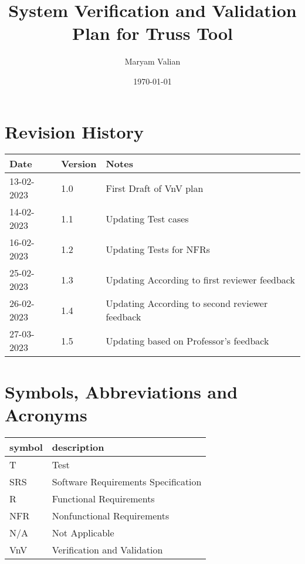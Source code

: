 \documentclass[12pt, titlepage]{article}
\begin{document}
\title{ System Verification and Validation Plan for Truss Tool} 
\author{Maryam Valian}
\date{\today}
	
\maketitle


\section{Revision History}

\begin{tabularx}{\textwidth}{p{3cm}p{2cm}X}
\toprule {\bf Date} & {\bf Version} & {\bf Notes}\\
\midrule
13-02-2023 & 1.0 & First Draft of VnV plan\\
14-02-2023 & 1.1& Updating Test cases   \\
16-02-2023 & 1.2& Updating Tests for NFRs   \\
25-02-2023 & 1.3& Updating According to first reviewer feedback   \\
26-02-2023 & 1.4& Updating According to second reviewer feedback   \\
27-03-2023 & 1.5& Updating based on Professor's feedback \\



\bottomrule
\end{tabularx}

\newpage

\tableofcontents

\newpage

\section{Symbols, Abbreviations and Acronyms}

\renewcommand{\arraystretch}{1.2}
\begin{tabular}{l l} 
  \toprule		
  \textbf{symbol} & \textbf{description}\\
  \midrule 
  T & Test\\
  SRS & Software Requirements Specification\\
  R & Functional Requirements\\
  NFR & Nonfunctional Requirements\\
  N/A & Not Applicable\\
  VnV & Verification and Validation\\
  
\bottomrule
\end{tabular}\\
\end{document}
